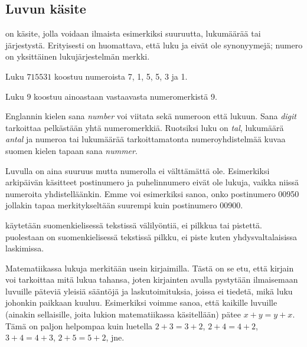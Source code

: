 

\subsection*{Luvun käsite}

 on käsite, jolla voidaan ilmaista esimerkiksi suuruutta, lukumäärää tai järjestystä. Erityisesti on huomattava, että luku ja  eivät ole synonyymejä; numero on yksittäinen lukujärjestelmän merkki.

\begin{esimerkki}
	Luku $715531$ koostuu numeroista 7, 1, 5, 5, 3 ja 1.
	
	Luku $9$ koostuu ainoastaan vastaavasta numeromerkistä 9.
\end{esimerkki}

Englannin kielen sana \textit{number} voi viitata sekä numeroon että lukuun. Sana \textit{digit} tarkoittaa pelkästään yhtä numeromerkkiä. Ruotsiksi luku on \textit{tal}, lukumäärä \textit{antal} ja numeroa tai lukumäärää tarkoittamatonta numeroyhdistelmää kuvaa suomen kielen tapaan sana \textit{nummer}.

Luvulla on aina suuruus mutta numerolla ei välttämättä ole. Esimerkiksi arkipäivän käsitteet postinumero ja puhelinnumero eivät ole lukuja, vaikka niissä numeroita yhdistelläänkin. Emme voi esimerkiksi sanoa, onko postinumero 00950 jollakin tapaa merkitykseltään suurempi kuin postinumero 00900.

 käytetään suomenkielisessä tekstissä välilyöntiä, ei pilkkua tai pistettä.
 puolestaan on suomenkielisessä tekstissä pilkku, ei piste kuten yhdysvaltalaisissa laskimissa.


Matematiikassa lukuja merkitään usein kirjaimilla. Tästä on se etu, että kirjain voi tarkoittaa mitä lukua
tahansa, joten kirjainten avulla pystytään ilmaisemaan luvuille päteviä yleisiä sääntöjä ja laskutoimituksia, joissa ei
tiedetä, mikä luku johonkin paikkaan kuuluu. Esimerkiksi voimme sanoa, että kaikille luvuille
(ainakin sellaisille, joita lukion matematiikassa käsitellään) pätee $x+y=y+x$. Tämä on paljon helpompaa
kuin luetella $2+3=3+2$, $2+4=4+2$, $3+4=4+3$, $2+5=5+2$, jne.

